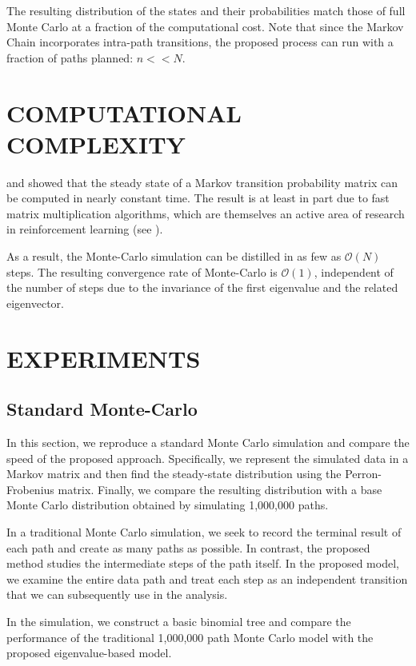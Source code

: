 \documentclass{wscpaperproc}
\theoremstyle{wsc}
\begin{document}
The resulting distribution of the states and their probabilities match those of full Monte Carlo at a fraction of the computational cost. Note that since the Markov Chain incorporates intra-path transitions, the proposed process can run with a fraction of paths planned: $n<<N$.

\section{COMPUTATIONAL COMPLEXITY}

 and  showed that the steady state of a Markov transition probability matrix can be computed in nearly constant time. The result is at least in part due to fast matrix multiplication algorithms, which are themselves an active area of research in reinforcement learning (see ). 

As a result, the Monte-Carlo simulation can be distilled in as few as $\mathcal{O}(N)$ steps. The resulting convergence rate of Monte-Carlo is $\mathcal{O}(1)$, independent of the number of steps due to the invariance of the first eigenvalue and the related eigenvector. 

\section{EXPERIMENTS}

\subsection{Standard Monte-Carlo}
In this section, we reproduce a standard Monte Carlo simulation and compare the speed of the proposed approach. Specifically, we represent the simulated data in a Markov matrix and then find the steady-state distribution using the Perron-Frobenius matrix. Finally, we compare the resulting distribution with a base Monte Carlo distribution obtained by simulating 1,000,000 paths. 

In a traditional Monte Carlo simulation, we seek to record the terminal result of each path and create as many paths as possible. In contrast, the proposed method studies the intermediate steps of the path itself. In the proposed model, we examine the entire data path and treat each step as an independent transition that we can subsequently use in the analysis. 

In the simulation, we construct a basic binomial tree and compare the performance of the traditional 1,000,000 path Monte Carlo model with the proposed eigenvalue-based model. 
\end{document}
